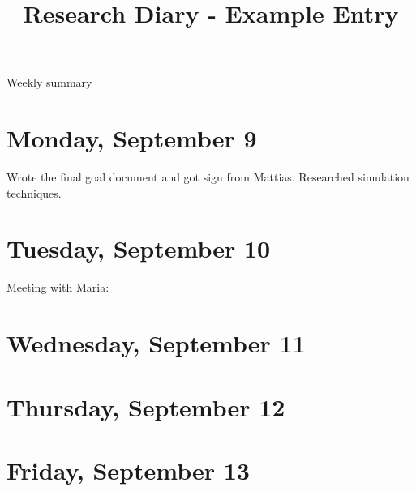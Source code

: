 \documentclass[11pt,letterpaper]{article}
\begin{document}
\univlogo

\title{Research Diary - Example Entry}

{\Huge Weekly summary}\\[5mm]

\section*{Monday, September 9 }
Wrote the final goal document and got sign from Mattias. Researched simulation techniques.

\section*{Tuesday, September 10}
Meeting with Maria:



\section*{Wednesday, September 11}

\section*{Thursday, September 12}

\section*{Friday, September 13}

\printbibliography
\end{document}
